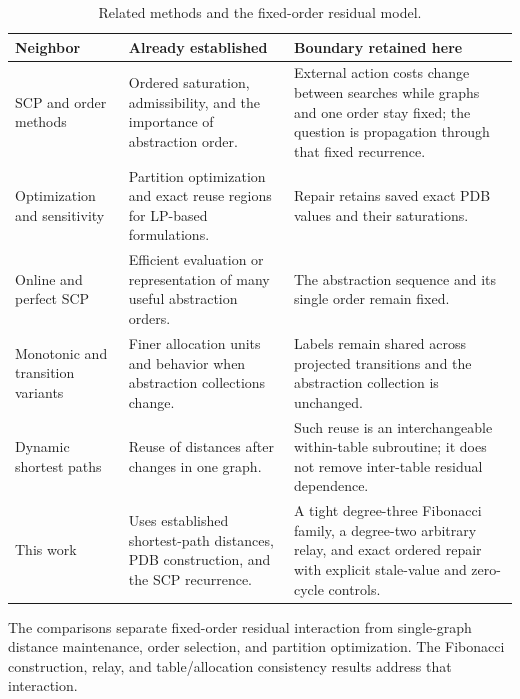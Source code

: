 \begin{table}[t]
\centering
\small
\begin{tabular}{@{}p{}p{}p{}@{}}
\toprule
Neighbor & Already established & Boundary retained here \\
\midrule
SCP and order methods \citep{comparison2017,scp2020,betterorders2017} & Ordered saturation, admissibility, and the importance of abstraction order. & External action costs change between searches while graphs and one order stay fixed; the question is propagation through that fixed recurrence. \\
Optimization and sensitivity \citep{dw2021,sensitivity2023,sensitivity2024} & Partition optimization and exact reuse regions for LP-based formulations. & Repair retains saved exact PDB values and their saturations. \\
Online and perfect SCP \citep{online2021,perfect2025} & Efficient evaluation or representation of many useful abstraction orders. & The abstraction sequence and its single order remain fixed. \\
Monotonic and transition variants \citep{transitioncp2021,monotonic2026} & Finer allocation units and behavior when abstraction collections change. & Labels remain shared across projected transitions and the abstraction collection is unchanged. \\
Dynamic shortest paths \citep{ramalingam1996,lpa2004,incremental2020} & Reuse of distances after changes in one graph. & Such reuse is an interchangeable within-table subroutine; it does not remove inter-table residual dependence. \\
This work & Uses established shortest-path distances, PDB construction, and the SCP recurrence. & A tight degree-three Fibonacci family, a degree-two arbitrary relay, and exact ordered repair with explicit stale-value and zero-cycle controls. \\
\bottomrule
\end{tabular}
\caption{Related methods and the fixed-order residual model.}
\label{tab:collision-audit}
\end{table}

The comparisons separate fixed-order residual interaction from single-graph distance maintenance, order selection, and partition optimization. The Fibonacci construction, relay, and table/allocation consistency results address that interaction.
